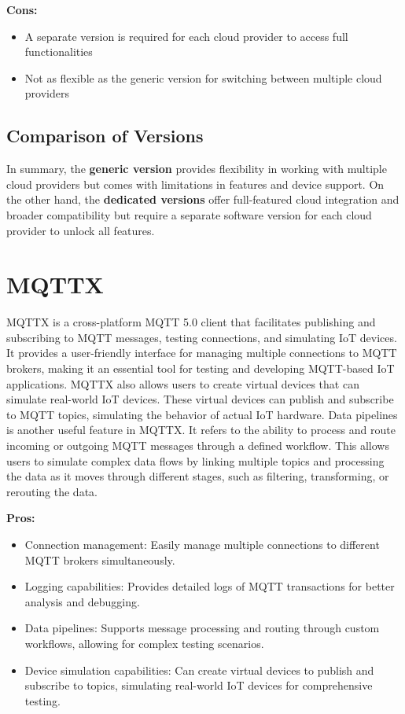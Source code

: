 \textbf{Cons:}
\begin{itemize}
    \item A separate version is required for each cloud provider to access full functionalities
    \item Not as flexible as the generic version for switching between multiple cloud providers
\end{itemize}

\subsection*{Comparison of Versions}
In summary, the \textbf{generic version} provides flexibility in working with multiple cloud providers but comes with limitations in features and device support. On the other hand, the \textbf{dedicated versions} offer full-featured cloud integration and broader compatibility but require a separate software version for each cloud provider to unlock all features.


\section{MQTTX}
\label{mqttx}
MQTTX\cite{site:mqttx} is a cross-platform MQTT 5.0 client that facilitates publishing and subscribing to MQTT messages, testing connections, and simulating IoT devices. It provides a user-friendly interface for managing multiple connections to MQTT brokers, making it an essential tool for testing and developing MQTT-based IoT applications.
MQTTX also allows users to create virtual devices that can simulate real-world IoT devices. These virtual devices can publish and subscribe to MQTT topics, simulating the behavior of actual IoT hardware. Data pipelines is another useful feature in MQTTX. It refers to the ability to process and route incoming or outgoing MQTT messages through a defined workflow. This allows users to simulate complex data flows by linking multiple topics and processing the data as it moves through different stages, such as filtering, transforming, or rerouting the data.

\textbf{Pros:}
\begin{itemize}
    \item Connection management: Easily manage multiple connections to different MQTT brokers simultaneously.
    \item Logging capabilities: Provides detailed logs of MQTT transactions for better analysis and debugging.
    \item Data pipelines: Supports message processing and routing through custom workflows, allowing for complex testing scenarios.
    \item Device simulation capabilities: Can create virtual devices to publish and subscribe to topics, simulating real-world IoT devices for comprehensive testing.
\end{itemize}

